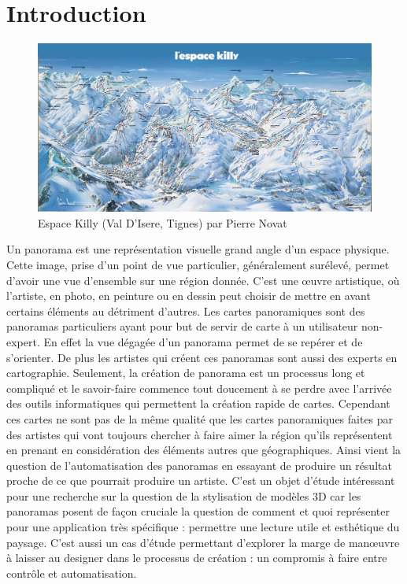 \chapter{Introduction}
\label{chap:intro}



\begin{figure}[b]
\centering
 \includegraphics[width=1.0\linewidth]{novat/PN_killy.jpg}
 \caption{\label{killy} Espace Killy (Val D'Isere, Tignes) par Pierre Novat}
\end{figure}

 Un panorama est une représentation visuelle grand angle d'un espace physique. Cette image, prise d'un point de vue particulier, généralement surélevé, permet d'avoir une vue d'ensemble sur une région donnée. C'est une œuvre artistique, où l'artiste, en photo, en peinture ou en dessin peut choisir de mettre en avant certains éléments au détriment d'autres. Les cartes panoramiques sont des panoramas particuliers ayant pour but de servir de carte à un utilisateur non-expert. En effet la vue dégagée d'un panorama permet de se repérer et de s’orienter. De plus les artistes qui créent ces panoramas sont aussi des experts en cartographie. Seulement, la création de panorama est un processus long et compliqué et le savoir-faire commence tout doucement à se perdre avec l'arrivée des outils informatiques qui permettent la création rapide de cartes. Cependant ces cartes ne sont pas de la même qualité que les cartes panoramiques faites par des artistes qui vont toujours chercher à faire aimer la région qu'ils représentent en prenant en considération des éléments autres que géographiques. Ainsi vient la question de l'automatisation des panoramas en essayant de produire un résultat proche de ce que pourrait produire un artiste. C'est un objet d’étude intéressant pour une recherche sur la question de la stylisation de modèles 3D car les panoramas posent de façon cruciale la question de comment et quoi représenter pour une application très spécifique : permettre une lecture utile et esthétique du paysage. C’est aussi un cas d’étude permettant d’explorer la marge de manœuvre à laisser au designer dans le processus de création : un  compromis à faire entre contrôle et automatisation.
 

